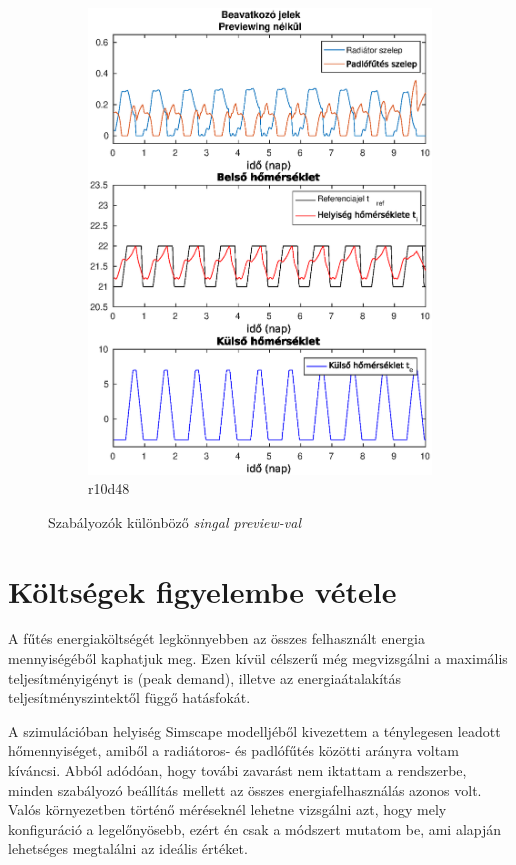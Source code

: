 \begin{figure}[H]
\begin{subfigure}[t]{0.51\textwidth}
		\includegraphics[trim=0 0 0 0, clip,width=\textwidth]{figures/onlab/compare/A_C_P10D48}
		\caption{r10d48}
		\label{fig:mpc-pr10d48}
	\end{subfigure}
		\caption{Szabályozók különböző \textit{singal preview-val}}
\end{figure}


\section{Költségek figyelembe vétele}


A fűtés energiaköltségét legkönnyebben az összes felhasznált energia mennyiségéből kaphatjuk meg. Ezen kívül célszerű még megvizsgálni a maximális teljesítményigényt is (peak demand), illetve az energiaátalakítás teljesítményszintektől függő hatásfokát.

A szimulációban helyiség Simscape modelljéből kivezettem a ténylegesen leadott hőmennyiséget, amiből a radiátoros- és padlófűtés közötti arányra voltam kíváncsi. Abból adódóan, hogy továbi zavarást nem iktattam a rendszerbe, minden szabályozó beállítás mellett az összes energiafelhasználás azonos volt. Valós környezetben történő méréseknél lehetne vizsgálni azt, hogy mely konfiguráció a legelőnyösebb, ezért én csak a módszert mutatom be, ami alapján lehetséges megtalálni az ideális értéket.


